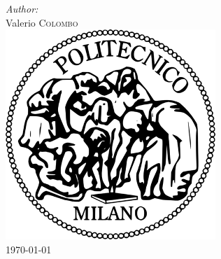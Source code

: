 \documentclass[12pt]{article}
\begin{document}
\begin{titlepage}
\Large \emph{Author:}\\
Valerio \textsc{Colombo}\\[3cm] %


\includegraphics[scale=0.4]{img/Logo_Politecnico_Milano.png}\\[1cm] %


{\large \today}\\[2cm] %
 

\newpage

\end{titlepage}

\tableofcontents

\newpage






\end{document}
